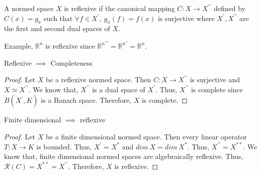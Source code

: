 \begin{definition}[Reflexive]
	A normed space $X$ is reflexive if the canonical mapping $C : X \to X^{\prime\prime}$ defined by $C(x) = g_x$ such that $\forall f \in X^\prime,\ g_x(f) = f(x)$ is surjective where $X^\prime, X^{\prime\prime}$ are the first and second dual spaces of $X$.
\end{definition}

Example, $\mathbb{R}^n$ is reflexive since ${\mathbb{R}^n}^{\prime\prime} = {\mathbb{R}^n}^\prime = \mathbb{R}^n$.

\begin{theorem}
	Reflexive $\implies$ Completeness
\end{theorem}
\begin{proof}
	Let $X$ be a reflexive normed space.
	Then $C : X \to X^{\prime\prime}$ is surjective and $X \simeq X^{\prime\prime}$.
	We know that, $X^{\prime\prime}$ is a dual space of $X^\prime$.
	Thus, $X^{\prime\prime}$ is complete since $B(X^\prime,K)$ is a Banach space.
	Therefore, $X$ is complete.
\end{proof}

\begin{theorem}
	Finite dimensional $\implies$ reflexive
\end{theorem}
\begin{proof}
	Let $X$ be a finite dimensional normed space.
	Then every linear operator $T : X \to K$ is bounded.
	Thus, $X^\prime = X^\ast$ and $dim\ X = dim\ X^\ast$.
	Thus, $X^{\prime\prime} = X^{\ast\ast}$.
	We know that, finite dimensional normed spaces are algebraically reflexive.
	Thus, $\mathscr{R}(C) = X^{\ast\ast} = X^{\prime\prime}$.
	Therefore, $X$ is reflexive.
\end{proof}


